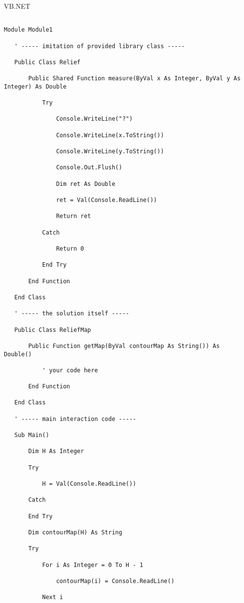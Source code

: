 \documentclass[]{article}
\begin{document}
VB.NET

\begin{verbatim}

Module Module1

   ' ----- imitation of provided library class -----

   Public Class Relief

       Public Shared Function measure(ByVal x As Integer, ByVal y As Integer) As Double

           Try

               Console.WriteLine("?")

               Console.WriteLine(x.ToString())

               Console.WriteLine(y.ToString())

               Console.Out.Flush()

               Dim ret As Double

               ret = Val(Console.ReadLine())

               Return ret

           Catch

               Return 0

           End Try

       End Function

   End Class

   ' ----- the solution itself -----

   Public Class ReliefMap

       Public Function getMap(ByVal contourMap As String()) As Double()

           ' your code here

       End Function

   End Class

   ' ----- main interaction code -----

   Sub Main()

       Dim H As Integer

       Try

           H = Val(Console.ReadLine())

       Catch

       End Try

       Dim contourMap(H) As String

       Try

           For i As Integer = 0 To H - 1

               contourMap(i) = Console.ReadLine()

           Next i


\end{verbatim}
\end{document}
